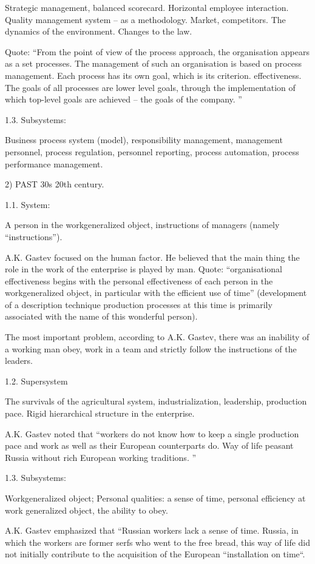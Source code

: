 \documentclass[11pt,a4paper]{book}
\begin{document}
Strategic management, balanced scorecard. Horizontal employee interaction.
Quality management system -- as a methodology. Market, competitors. The
dynamics of the environment. Changes to the law.

Quote: “From the point of view of the process approach, the organisation
appears as a set processes. The management of such an organisation is based on
process management.  Each process has its own goal, which is its criterion.
effectiveness. The goals of all processes are lower level goals, through the
implementation of which top-level goals are achieved -- the goals of the
company. ”

1.3. Subsystems:

Business process system (model), responsibility management, management
personnel, process regulation, personnel reporting, process automation,
process performance management.

2) PAST 30s 20th century.

1.1.  System:

A person in the workgeneralized object, instructions of managers (namely “instructions”).

A.K. Gastev focused on the human factor. He believed that the main thing the
role in the work of the enterprise is played by man. Quote: “organisational
effectiveness begins with the personal effectiveness of each person in the
workgeneralized object, in particular with the efficient use of time” (development of a
description technique production processes at this time is primarily
associated with the name of this wonderful person).

The most important problem, according to A.K. Gastev, there was an inability
of a working man obey, work in a team and strictly follow the instructions of
the leaders.

1.2.  Supersystem

The survivals of the agricultural system, industrialization, leadership,
production pace.  Rigid hierarchical structure in the enterprise.

A.K. Gastev noted that “workers do not know how to keep a single production
pace and work as well as their European counterparts do. Way of life peasant
Russia without rich European working traditions. ”

1.3.  Subsystems:

Workgeneralized object; Personal qualities: a sense of time, personal efficiency at work
generalized object, the ability to obey.

A.K. Gastev emphasized that “Russian workers lack a sense of time.  Russia, in
which the workers are former serfs who went to the free bread, this way of
life did not initially contribute to the acquisition of the European
“installation on time“.
\end{document}
